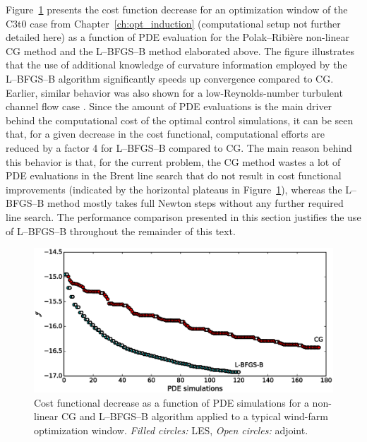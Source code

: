 	Figure~\ref{fig:cg_bfgs} presents the cost function decrease for an optimization window of the C3t0 case from Chapter~\ref{ch:opt_induction} (computational setup not further detailed here) as a function of PDE evaluation for the Polak--Ribi\`ere non-linear CG method and the L--BFGS--B method elaborated above. The figure illustrates that the use of additional knowledge of curvature information employed by the L--BFGS--B algorithm significantly speeds up convergence compared to CG. Earlier, similar behavior was also shown for a low-Reynolds-number turbulent channel flow case \citep{nita2016efficiency}. Since the amount of PDE evaluations is the main driver behind the computational cost of the optimal control simulations, it can be seen that, for a given decrease in the cost functional, computational efforts are reduced by a factor 4 for L--BFGS--B compared to CG. The main reason behind this behavior is that, for the current problem, the CG method wastes a lot of PDE evaluations in the Brent line search that do not result in cost functional improvements (indicated by the horizontal plateaus in Figure~\ref{fig:cg_bfgs}), whereas the L--BFGS--B method mostly takes full Newton steps without any further required line search. The performance comparison presented in this section justifies the use of L--BFGS--B throughout the remainder of this text. 
	
	\begin{figure}
		\centering
		\includegraphics[width=\linewidth]{chapters/optimal_control_problem/figure5_bw.eps}
		\caption[Cost functional decrease as a function of PDE simulations for a non-linear CG and L--BFGS--B algorithm applied to a typical wind-farm optimization window.]{Cost functional decrease as a function of PDE simulations for a non-linear CG and L--BFGS--B algorithm applied to a typical wind-farm optimization window. \emph{Filled circles: } LES, \emph{Open circles: } adjoint. }
		\label{fig:cg_bfgs}
	\end{figure}
	

